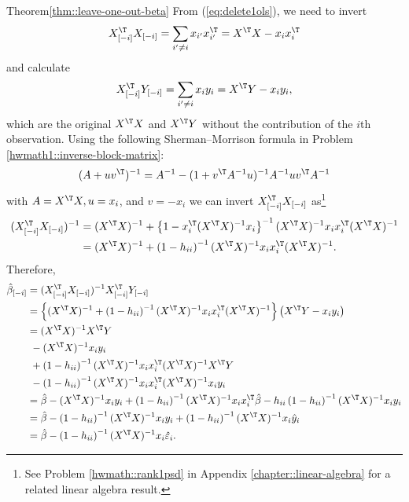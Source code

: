 \begin{myproof}{Theorem}{\ref{thm::leave-one-out-beta}}
From (\ref{eq:delete1ols}), we need to invert 
\[
X_{[-i]}^{\T}X_{[-i]}=\sum_{i'\neq i}x_{i'}x_{i'}^{\T}=X^{\T}X-x_{i}x_{i}^{\T}
\]
 and calculate 
\[
X_{[-i]}^{\T}Y_{[-i]}=\sum_{i'\neq i}x_{i}y_{i}=X^{\T}Y-x_{i}y_{i},
\]
which are the original $X^{\T}X$ and $X^{\T}Y$ without the contribution of the $i$th observation. 
Using the following Sherman--Morrison formula in Problem \ref{hwmath1::inverse-block-matrix}:
\[
(A+uv^{\T})^{-1}=A^{-1}-(1+v^{\T}A^{-1}u)^{-1}A^{-1}uv^{\T}A^{-1}
\]
with $A=X^{\T}X,u=x_i$, and $v=-x_{i}$ we can invert $X_{[-i]}^{\T}X_{[-i]}$
as\footnote{See Problem \ref{hwmath::rank1psd} in Appendix \ref{chapter::linear-algebra} for a related linear algebra result.}
\begin{align*}
(X_{[-i]}^{\T}X_{[-i]})^{-1} & =(X^{\T}X)^{-1}+\left\{ 1-x_{i}^{\T}(X^{\T}X)^{-1}x_{i}\right\} ^{-1}(X^{\T}X)^{-1}x_{i}x_{i}^{\T}(X^{\T}X)^{-1}\\
 & =(X^{\T}X)^{-1}+\left(1-h_{ii}\right)^{-1}(X^{\T}X)^{-1}x_{i}x_{i}^{\T}(X^{\T}X)^{-1}.
\end{align*}
Therefore, 
\begin{align*}
\hat{\beta}_{[-i]} & =(X_{[-i]}^{\T}X_{[-i]})^{-1}X_{[-i]}^{\T}Y_{[-i]}\\
 & =\left\{ (X^{\T}X)^{-1}+\left(1-h_{ii}\right)^{-1}(X^{\T}X)^{-1}x_{i}x_{i}^{\T}(X^{\T}X)^{-1}\right\} \left(X^{\T}Y-x_{i}y_{i}\right)\\
 & =(X^{\T}X)^{-1}X^{\T}Y \\
 &\  -(X^{\T}X)^{-1}x_{i}y_{i}\\
 & \ +\left(1-h_{ii}\right)^{-1}(X^{\T}X)^{-1}x_{i}x_{i}^{\T}(X^{\T}X)^{-1}X^{\T}Y \\
 &\ -\left(1-h_{ii}\right)^{-1}(X^{\T}X)^{-1}x_{i}x_{i}^{\T}(X^{\T}X)^{-1}x_{i}y_{i}\\
 & =\hat{\beta}-(X^{\T}X)^{-1}x_{i}y_{i}+\left(1-h_{ii}\right)^{-1}(X^{\T}X)^{-1}x_{i}x_{i}^{\T}\hat{\beta}-h_{ii}\left(1-h_{ii}\right)^{-1}(X^{\T}X)^{-1}x_{i}y_{i}\\
 & =\hat{\beta}-\left(1-h_{ii}\right)^{-1}(X^{\T}X)^{-1}x_{i}y_{i}+\left(1-h_{ii}\right)^{-1}(X^{\T}X)^{-1}x_{i}\hat{y}_{i}\\
 & =\hat{\beta}-\left(1-h_{ii}\right)^{-1}(X^{\T}X)^{-1}x_{i}\hat{\varepsilon}_{i}.
\end{align*}
\end{myproof}



